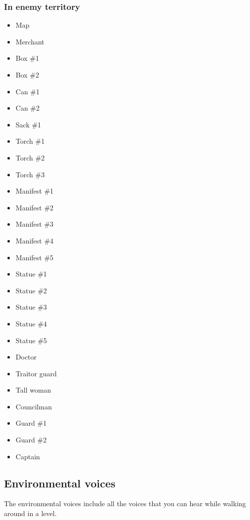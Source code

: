 \subsubsection*{In enemy territory}
\begin{itemize}
	\item Map
	\item Merchant
	\item Box \#{}1
	\item Box \#{}2
	\item Can \#{}1
	\item Can \#{}2
	\item Sack \#{}1
	\item Torch \#{}1
	\item Torch \#{}2
	\item Torch \#{}3
	\item Manifest \#{}1
	\item Manifest \#{}2
	\item Manifest \#{}3
	\item Manifest \#{}4
	\item Manifest \#{}5
	\item Statue \#{}1
	\item Statue \#{}2
	\item Statue \#{}3
	\item Statue \#{}4
	\item Statue \#{}5
	\item Doctor
	\item Traitor guard
	\item Tall woman
	\item Councilman
	\item Guard \#{}1
	\item Guard \#{}2
	\item Captain
\end{itemize}

\subsection{Environmental voices}
The environmental voices include all the voices that you can hear while walking around in a level.

